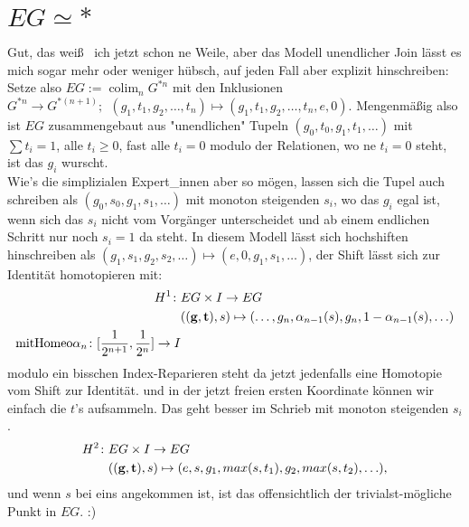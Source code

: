 \documentclass[11pt,twoside,a4paper]{scrbook} %
\DeclareMathOperator{\colim}{colim}
\begin{document}
\section{$EG\simeq *$}
Gut, das wei\ss ~ ich jetzt schon ne Weile, aber das Modell unendlicher Join l\"asst es mich sogar mehr oder weniger h\"ubsch, auf jeden Fall aber explizit hinschreiben:
Setze also $EG:=\colim_n G^{\ast n}$ mit den Inklusionen $G^{\ast n}\rightarrow G^{\ast (n+1)}; ~~ (g_1,t_1,g_2,\ldots,t_n) \mapsto (g_1,t_1,g_2,\ldots,t_n,e,0)$.
Mengenm\"a\ss ig also ist $EG$ zusammengebaut aus "unendlichen" Tupeln $(g_0,t_0,g_1,t_1,\ldots)$ mit $\sum t_i=1$, alle $t_i\geq 0$, fast alle $t_i=0$ modulo der 
Relationen, wo ne $t_i=0$ steht, ist das $g_i$ wurscht.\\
Wie's die simplizialen Expert\_innen aber so m\"ogen, lassen sich die Tupel auch schreiben als $(g_0,s_0,g_1,s_1,\ldots)$ mit monoton steigenden $s_i$, wo das
$g_i$ egal ist, wenn sich das $s_i$ nicht vom Vorg\"anger unterscheidet und ab einem endlichen Schritt nur noch $s_i = 1$ da steht.
In diesem Modell l\"asst sich hochshiften hinschreiben als $(g_1,s_1,g_2,s_2,\ldots) \mapsto (e,0,g_1,s_1,\ldots)$, der Shift l\"asst sich zur Identit\"at homotopieren mit:
$$
\begin{aligned}
H^1\colon& EG\times I\rightarrow EG\\
&(({\bold g,\bold t}),s)\mapsto (\ldots, g_n,\alpha_{n-1}(s),g_n,1-\alpha_{n-1}(s),\ldots) \\ \mathrm{mit Homeo} \alpha_n\colon [\frac{1}{2^{n+1}},\frac{1}{2^n}] \rightarrow I
\end{aligned}$$
modulo ein bisschen Index-Reparieren steht da jetzt jedenfalls eine Homotopie vom Shift zur Identit\"at.
und in der jetzt freien ersten Koordinate k\"onnen wir einfach die $t$'s aufsammeln. Das geht besser im Schrieb mit monoton steigenden $s_i$.
$$
\begin{aligned}
H^2\colon& EG\times I\rightarrow EG\\
&(({\bold g,\bold t}),s)\mapsto (e,s,g_1,max(s,t_1),g_2,max(s,t_2),\ldots),
\end{aligned}$$
und wenn $s$ bei eins angekommen ist, ist das offensichtlich der trivialst-m\"ogliche Punkt in $EG$. :)
\end{document}
